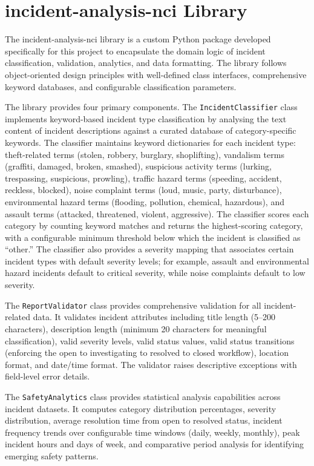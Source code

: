 \documentclass[conference]{IEEEtran}
\begin{document}
\section{incident-analysis-nci Library}

The incident-analysis-nci library is a custom Python package developed specifically for this project to encapsulate the domain logic of incident classification, validation, analytics, and data formatting. The library follows object-oriented design principles with well-defined class interfaces, comprehensive keyword databases, and configurable classification parameters.

The library provides four primary components. The \texttt{IncidentClassifier} class implements keyword-based incident type classification by analysing the text content of incident descriptions against a curated database of category-specific keywords. The classifier maintains keyword dictionaries for each incident type: theft-related terms (stolen, robbery, burglary, shoplifting), vandalism terms (graffiti, damaged, broken, smashed), suspicious activity terms (lurking, trespassing, suspicious, prowling), traffic hazard terms (speeding, accident, reckless, blocked), noise complaint terms (loud, music, party, disturbance), environmental hazard terms (flooding, pollution, chemical, hazardous), and assault terms (attacked, threatened, violent, aggressive). The classifier scores each category by counting keyword matches and returns the highest-scoring category, with a configurable minimum threshold below which the incident is classified as ``other.'' The classifier also provides a severity mapping that associates certain incident types with default severity levels; for example, assault and environmental hazard incidents default to critical severity, while noise complaints default to low severity.

The \texttt{ReportValidator} class provides comprehensive validation for all incident-related data. It validates incident attributes including title length (5--200 characters), description length (minimum 20 characters for meaningful classification), valid severity levels, valid status values, valid status transitions (enforcing the open to investigating to resolved to closed workflow), location format, and date/time format. The validator raises descriptive exceptions with field-level error details.

The \texttt{SafetyAnalytics} class provides statistical analysis capabilities across incident datasets. It computes category distribution percentages, severity distribution, average resolution time from open to resolved status, incident frequency trends over configurable time windows (daily, weekly, monthly), peak incident hours and days of week, and comparative period analysis for identifying emerging safety patterns.
\end{document}

